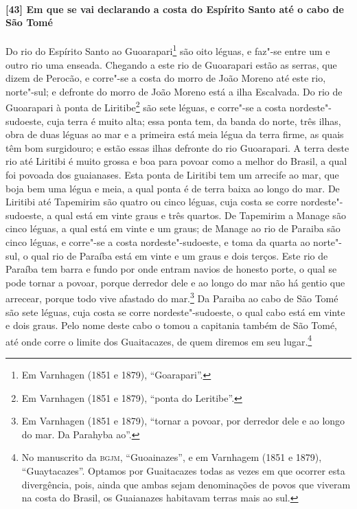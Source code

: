\paragraph{[43] Em que se vai declarando a costa do Espírito Santo até o cabo de São Tomé} \quad
Do rio do Espírito Santo ao Guoarapari\footnote{ Em Varnhagen (1851 e 1879),
``Goarapari''.} são oito léguas, e faz"-se entre um e outro rio uma enseada. Chegando a
este rio de Guoarapari estão as serras, que dizem de Perocão, e corre"-se a costa do morro
de João Moreno até este rio, norte"-sul; e defronte do morro de João Moreno está a ilha
Escalvada. Do rio de Guoarapari à ponta de Liritibe\footnote{ Em Varnhagen (1851 e 1879),
``ponta do Leritibe''.} são sete léguas, e corre"-se a costa nordeste"-sudoeste, cuja terra
é muito alta; essa ponta tem, da banda do norte, três ilhas, obra de duas léguas ao mar e
a primeira está meia légua da terra firme, as quais têm bom surgidouro; e estão essas
ilhas defronte do rio Guoarapari. A terra deste rio até Liritibi é muito grossa e boa para
povoar como a melhor do Brasil, a qual foi povoada dos guaianases. Esta ponta de Liritibi
tem um arrecife ao mar, que boja bem uma légua e meia, a qual ponta é de terra baixa ao
longo do mar. De Liritibi até Tapemirim são quatro ou cinco léguas, cuja costa se corre
nordeste"-sudoeste, a qual está em vinte graus e três quartos. De Tapemirim a Manage são
cinco léguas, a qual está em vinte e um graus; de Manage ao rio de Paraiba são cinco
léguas, e corre"-se a costa nordeste"-sudoeste, e toma da quarta ao norte"-sul, o qual rio de
Paraíba está em vinte e um graus e dois terços. Este rio de Paraíba tem barra e fundo por
onde entram navios de honesto porte, o qual se pode tornar a povoar, porque derredor dele
e ao longo do mar não há gentio que arrecear, porque todo vive afastado do mar.\footnote{
Em Varnhagen (1851 e 1879), ``tornar a povoar, por derredor dele e ao longo do mar. Da
Parahyba ao''.} Da Paraiba ao cabo de São Tomé são sete léguas, cuja costa se corre
nordeste"-sudoeste, o qual cabo está em vinte e dois graus. Pelo nome deste cabo o tomou a
capitania também de São Tomé, até onde corre o limite dos Guaitacazes, de quem diremos em
seu lugar.\footnote{ No manuscrito da \textsc{bgjm}, ``Guoainazes'', e em Varnhagem (1851
e 1879), ``Guaytacazes''. Optamos por Guaitacazes todas as vezes em que ocorrer esta
divergência, pois, ainda que ambas sejam denominações de povos que viveram na costa do
Brasil, os Guaianazes habitavam terras mais ao sul.}

